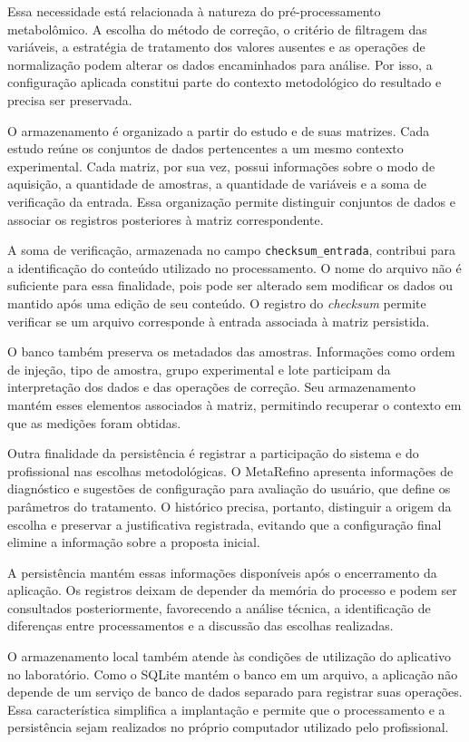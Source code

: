 Essa necessidade está relacionada à natureza do pré-processamento metabolômico. A escolha do método de correção, o critério de filtragem das variáveis, a estratégia de tratamento dos valores ausentes e as operações de normalização podem alterar os dados encaminhados para análise. Por isso, a configuração aplicada constitui parte do contexto metodológico do resultado e precisa ser preservada.

O armazenamento é organizado a partir do estudo e de suas matrizes. Cada estudo reúne os conjuntos de dados pertencentes a um mesmo contexto experimental. Cada matriz, por sua vez, possui informações sobre o modo de aquisição, a quantidade de amostras, a quantidade de variáveis e a soma de verificação da entrada. Essa organização permite distinguir conjuntos de dados e associar os registros posteriores à matriz correspondente.

A soma de verificação, armazenada no campo \texttt{checksum\_\allowbreak{}entrada}, contribui para a identificação do conteúdo utilizado no processamento. O nome do arquivo não é suficiente para essa finalidade, pois pode ser alterado sem modificar os dados ou mantido após uma edição de seu conteúdo. O registro do \textit{checksum} permite verificar se um arquivo corresponde à entrada associada à matriz persistida.

O banco também preserva os metadados das amostras. Informações como ordem de injeção, tipo de amostra, grupo experimental e lote participam da interpretação dos dados e das operações de correção. Seu armazenamento mantém esses elementos associados à matriz, permitindo recuperar o contexto em que as medições foram obtidas.

Outra finalidade da persistência é registrar a participação do sistema e do profissional nas escolhas metodológicas. O MetaRefino apresenta informações de diagnóstico e sugestões de configuração para avaliação do usuário, que define os parâmetros do tratamento. O histórico precisa, portanto, distinguir a origem da escolha e preservar a justificativa registrada, evitando que a configuração final elimine a informação sobre a proposta inicial.

A persistência mantém essas informações disponíveis após o encerramento da aplicação. Os registros deixam de depender da memória do processo e podem ser consultados posteriormente, favorecendo a análise técnica, a identificação de diferenças entre processamentos e a discussão das escolhas realizadas.

O armazenamento local também atende às condições de utilização do aplicativo no laboratório. Como o SQLite mantém o banco em um arquivo, a aplicação não depende de um serviço de banco de dados separado para registrar suas operações. Essa característica simplifica a implantação e permite que o processamento e a persistência sejam realizados no próprio computador utilizado pelo profissional.

